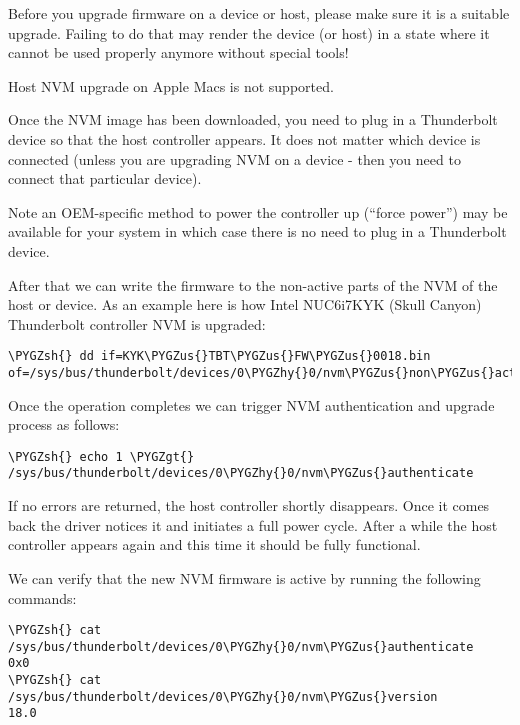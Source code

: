 \documentclass[a4paper,8pt,english]{sphinxmanual}
\def\PYGZus{\char`\_}
\def\PYGZgt{\char`\>}
\def\PYGZsh{\char`\#}
\def\PYGZhy{\char`\-}
\begin{document}
Before you upgrade firmware on a device or host, please make sure it is a
suitable upgrade. Failing to do that may render the device (or host) in a
state where it cannot be used properly anymore without special tools!

Host NVM upgrade on Apple Macs is not supported.

Once the NVM image has been downloaded, you need to plug in a
Thunderbolt device so that the host controller appears. It does not
matter which device is connected (unless you are upgrading NVM on a
device - then you need to connect that particular device).

Note an OEM-specific method to power the controller up (``force power'') may
be available for your system in which case there is no need to plug in a
Thunderbolt device.

After that we can write the firmware to the non-active parts of the NVM
of the host or device. As an example here is how Intel NUC6i7KYK (Skull
Canyon) Thunderbolt controller NVM is upgraded:

\begin{Verbatim}[commandchars=\\\{\}]
\PYGZsh{} dd if=KYK\PYGZus{}TBT\PYGZus{}FW\PYGZus{}0018.bin of=/sys/bus/thunderbolt/devices/0\PYGZhy{}0/nvm\PYGZus{}non\PYGZus{}active0/nvmem
\end{Verbatim}

Once the operation completes we can trigger NVM authentication and
upgrade process as follows:

\begin{Verbatim}[commandchars=\\\{\}]
\PYGZsh{} echo 1 \PYGZgt{} /sys/bus/thunderbolt/devices/0\PYGZhy{}0/nvm\PYGZus{}authenticate
\end{Verbatim}

If no errors are returned, the host controller shortly disappears. Once
it comes back the driver notices it and initiates a full power cycle.
After a while the host controller appears again and this time it should
be fully functional.

We can verify that the new NVM firmware is active by running the following
commands:

\begin{Verbatim}[commandchars=\\\{\}]
\PYGZsh{} cat /sys/bus/thunderbolt/devices/0\PYGZhy{}0/nvm\PYGZus{}authenticate
0x0
\PYGZsh{} cat /sys/bus/thunderbolt/devices/0\PYGZhy{}0/nvm\PYGZus{}version
18.0
\end{Verbatim}
\end{document}
